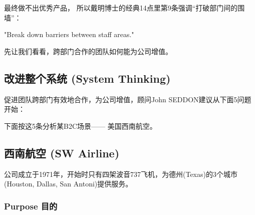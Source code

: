 最终做不出优秀产品，
所以戴明博士的经典14点里第9条强调``打破部门间的围墙''：

\begin{description}
\tightlist
\item[]
"Break down barriers between staff areas."
\end{description}

先让我们看看，跨部门合作的团队如何能为公司增值。

\hypertarget{ux6539ux8fdbux6574ux4e2aux7cfbux7edf-system-thinking}{%
\subsection{改进整个系统 (System
Thinking)}\label{ux6539ux8fdbux6574ux4e2aux7cfbux7edf-system-thinking}}

促进团队跨部门有效地合作，为公司增值，顾问John
SEDDON建议从下面5问题开始：






下面按这5条分析某B2C场景------ 美国西南航空。

\hypertarget{ux897fux5357ux822aux7a7a-sw-airline}{%
\subsection{西南航空 (SW
Airline)}\label{ux897fux5357ux822aux7a7a-sw-airline}}

公司成立于1971年，开始时只有四架波音737飞机，为德州(Texas)的3个城市(Houston,
Dallas, San Antoni)提供服务。

\hypertarget{purpose-ux76eeux7684}{%
\subsubsection{Purpose 目的}\label{purpose-ux76eeux7684}}

